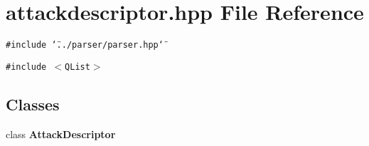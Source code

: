 \section{attackdescriptor.hpp File Reference}
\label{attackdescriptor_8hpp}
{\tt \#include \char`\"{}../parser/parser.hpp\char`\"{}}\par
{\tt \#include $<$QList$>$}\par
\subsection*{Classes}
\begin{CompactItemize}
\item 
class {\bf Attack\-Descriptor}
\end{CompactItemize}

